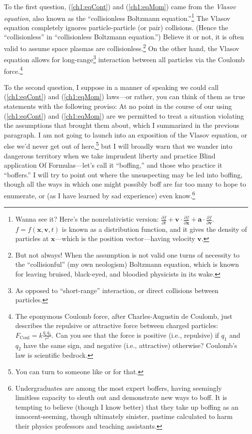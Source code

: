 To the first question, (\ref{ch1:eqCont}) and (\ref{ch1:eqMom}) came from the
\emph{Vlasov equation}, also known as the ``collisionless Boltzmann
equation.''\footnote{Wanna see it?  Here's the nonrelativistic version:
  $\frac{\partial f}{\partial t} + \mathbf{v} \cdot \frac{\partial f}{\partial
    \mathbf{x}} + \mathbf{a} \cdot \frac{\partial f}{\partial \mathbf{v}}$.
  $f = f (\mathbf{x}, \mathbf{v}, t)$ is known as a distribution function, and
  it gives the density of particles at $\mathbf{x}$---which is the position
  vector---having velocity $\mathbf{v}$.} The Vlasov equation completely ignores
particle-particle (or pair) collisions. (Hence the ``collisionless'' in
``collisionless Boltzmann equation.'') Believe it or not, it is often valid to
assume space plasmas are collisionless.\footnote{But not always!  When the
  assumption is not valid one turns of necessity to the ``collisionful'' (my own
  neologism) Boltzmann equation, which is known for leaving bruised, black-eyed,
  and bloodied physicists in its wake.} On the other hand, the Vlasov equation
allows for long-range\footnote{As opposed to ``short-range'' interaction, or
  direct collisions between particles.}  interaction between all particles via
the Coulomb force.\footnote{The eponymous Coulomb force, after Charles-Augustin
  de Coulomb, just describes the repulsive or attractive force between charged
  particles: $F_{\textrm{Coul}} = k \frac{q_1 q_2}{r^2}$. Can you see that the
  force is positive (i.e., repulsive) if $q_1$ and $q_2$ have the same sign, and
  negative (i.e., attractive) otherwise? Coulomb's law is scientific bedrock.}

To the second question, I suppose in a manner of speaking we could call
(\ref{ch1:eqCont}) and (\ref{ch1:eqMom}) laws---or rather, you can think of them
as true statements with the following proviso: At no point in the course of our
using (\ref{ch1:eqCont}) and (\ref{ch1:eqMom}) are we permitted to treat a
situation violating the assumptions that brought them about, which I summarized
in the previous paragraph. I am not going to launch into an exposition of the
Vlasov equation, or else we'd never get out of here,\footnote{You can turn to
  someone like \citet{Chen1974} or \citet{Bellan2008} for that.} but I will
broadly warn that we wander into dangerous territory when we take imprudent
liberty and practice Blind application Of Formulas---let's call it ``boffing,''
and those who practice it ``boffers.'' I will try to point out where the
unsuspecting may be led into boffing, though all the ways in which one might
possibly boff are far too many to hope to enumerate, or (as I have learned by
sad experience) even know.\footnote{Undergraduates are among the most expert
  boffers, having seemingly limitless capacity to sleuth out and demonstrate new
  ways to boff. It is tempting to believe (though I know better) that they take
  up boffing as an innocent-seeming, though ultimately sinister, pastime
  calculated to harm their physics professors and teaching assistants.}

